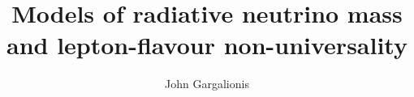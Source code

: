 \title{Models of radiative neutrino mass and lepton-flavour non-universality}

\author{John Gargalionis}



